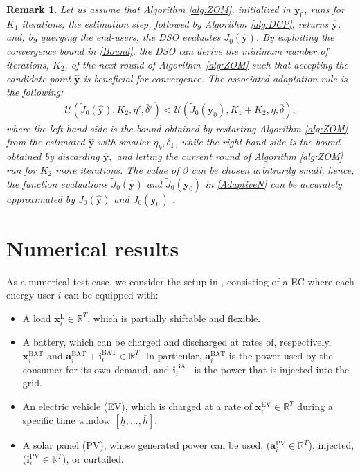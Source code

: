 \documentclass[letterpaper, 10 pt, conference]{ieeeconf}
\newcommand{\real}{\mathbb{R}}
\newcommand\abf{\mathbf{a}}
\newcommand\ibf{\mathbf{i}}
\newcommand\xbf{\mathbf{x}}
\newcommand\ybf{\mathbf{y}}
\newtheorem{remark}{Remark}
\begin{document}
\begin{remark}
Let us assume that Algorithm \ref{alg:ZOM}, initialized in $\ybf_0$, runs for $K_1$ iterations; the estimation step, followed by Algorithm \ref{alg:DCP}, returns $\hat{\ybf}$, and, by querying the end-users, the DSO evaluates $J_0(\hat{\ybf})$. By exploiting the convergence bound in \ref{Bound}, the DSO can derive the minimum number of iterations, $K_2$, of the next round of Algorithm~\ref{alg:ZOM} such that accepting the candidate point $\hat{\ybf}$ is beneficial for convergence. The associated adaptation rule is the following:
\begin{align}\label{AdaptiveN}
    \mathcal{U}(\tilde{J}_0(\hat{\ybf}), K_2, \bar{\eta}', \bar{\delta}')<\mathcal{U}(\tilde{J}_0(\ybf_0), K_1+K_2, \bar{\eta}, \bar{\delta}), 
\end{align}
where the left-hand side is the bound obtained by restarting Algorithm \ref{alg:ZOM} from the estimated $\hat{\ybf}$ with smaller $\eta_k, \delta_k$, while the right-hand side is the bound obtained by discarding $\hat{\ybf},$ and letting the current round of Algorithm \ref{alg:ZOM} run for $K_2$ more iterations. The value of $\beta$ can be chosen arbitrarily small, hence, the function evaluations $\tilde{J}_0(\hat{\ybf})$ and $\tilde{J}_0(\ybf_0)$ in \eqref{AdaptiveN} can be accurately approximated by $J_0(\hat{\ybf})$ and $J_0(\ybf_0)$ \cite[Proposition 2.1]{li2025new}.
\end{remark}
\section{Numerical results}\label{NumRes}
As a numerical test case, we consider the setup in \cite{cianchi2025two}, consisting of a EC where each energy user $i$ can be equipped with: \begin{itemize}
    \item A load $\xbf^\text{L}_i \in \real^T$, which is partially shiftable and flexible.
    \item A battery, which can be charged and discharged at rates of, respectively, $\xbf_i^\text{BAT}$ and $\abf^\text{BAT}_i + \ibf^\text{BAT}_i \in \real^T$. In particular, $\abf_i^\text{BAT}$ is the power used by the consumer for its own demand, and $\ibf_i^\text{BAT}$ is the power that is injected into the grid.
    \item An electric vehicle (EV), which is charged at a rate of $\xbf^\text{EV}_i \in \real^T$ during a specific time window  $[\underline{h}, ..., \bar{h}]$.
    \item A solar panel (PV), whose generated power can be used, ($\abf_i^\text{PV} \in \real^T$), injected, ($\ibf_i^\text{PV} \in \real^T$), or curtailed.
\end{itemize}
\end{document}
